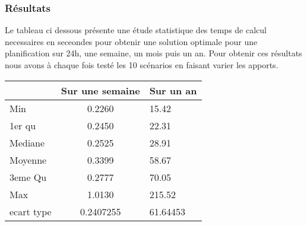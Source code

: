 \documentclass[a4paper]{report}
\begin{document}
\subsubsection{Résultats}
Le tableau ci dessous présente une étude statistique des temps de calcul necessaires en seceondes pour obtenir une solution optimale pour une planification sur 24h, une semaine, un mois puis un an. Pour obtenir ces résultats nous avons à chaque fois testé les 10 scénarios en faisant varier les apports.\\
\begin{tabular}{|l|c|l|}
  \hline
  &Sur une semaine &Sur un an\\
  \hline
  Min &0.2260&15.42\\
  \hline
  1er qu & 0.2450 & 22.31
\\
  \hline
  Mediane & 0.2525&28.91
\\
  \hline
  Moyenne &0.3399 & 58.67 

\\
  \hline
  3eme Qu &0.2777&70.05\\
  \hline
  Max & 1.0130 &215.52\\
\hline
 ecart type &0.2407255 &61.64453 
\\
 
  \hline
\end{tabular}
\end{document}
